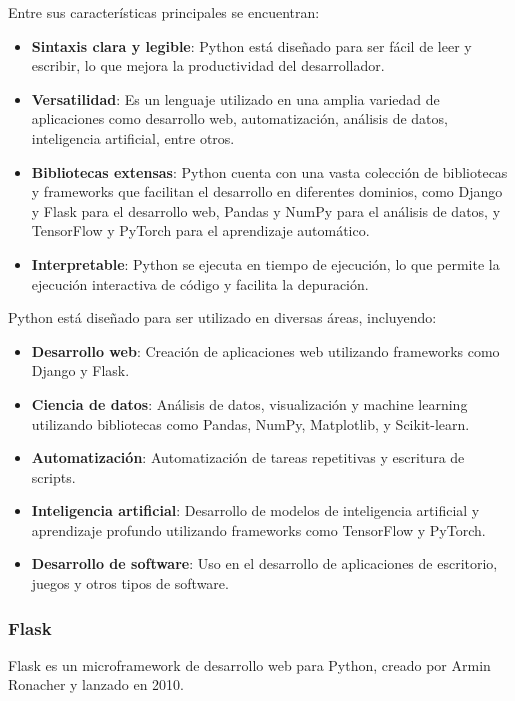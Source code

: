 \documentclass[a4paper, 12pt]{book}
\begin{document}
        Entre sus características principales se encuentran:

        \begin{itemize}
            \item \textbf{Sintaxis clara y legible}: Python está diseñado para ser fácil de leer y escribir, lo que mejora la productividad del desarrollador.
            \item \textbf{Versatilidad}: Es un lenguaje utilizado en una amplia variedad de aplicaciones como desarrollo web, automatización, análisis de datos, inteligencia artificial, entre otros.
            \item \textbf{Bibliotecas extensas}: Python cuenta con una vasta colección de bibliotecas y frameworks que facilitan el desarrollo en diferentes dominios, como Django y Flask para el desarrollo web, Pandas y NumPy para el análisis de datos, y TensorFlow y PyTorch para el aprendizaje automático.
            \item \textbf{Interpretable}: Python se ejecuta en tiempo de ejecución, lo que permite la ejecución interactiva de código y facilita la depuración.
        \end{itemize}

        Python\cite{PythonWikibooks,PythonTutorial} está diseñado para ser utilizado en diversas áreas, incluyendo:
        \begin{itemize}
            \item \textbf{Desarrollo web}: Creación de aplicaciones web utilizando frameworks como Django y Flask.
            \item \textbf{Ciencia de datos}: Análisis de datos, visualización y machine learning utilizando bibliotecas como Pandas, NumPy, Matplotlib, y Scikit-learn.
            \item \textbf{Automatización}: Automatización de tareas repetitivas y escritura de scripts.
            \item \textbf{Inteligencia artificial}: Desarrollo de modelos de inteligencia artificial y aprendizaje profundo utilizando frameworks como TensorFlow y PyTorch.
            \item \textbf{Desarrollo de software}: Uso en el desarrollo de aplicaciones de escritorio, juegos y otros tipos de software.
        \end{itemize}
        
        \subsubsection{Flask}
        Flask es un microframework de desarrollo web para Python, creado por Armin Ronacher y lanzado en 2010. 
        
\end{document}
